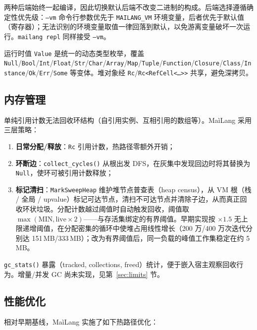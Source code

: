 \documentclass[10pt,a4paper]{article}
\begin{document}
两种后端始终一起编译，因此切换默认后端不改变二进制的构成。后端选择遵循确定性优先级：\texttt{--vm} 命令行参数优先于 \texttt{MAILANG\_VM} 环境变量，后者优先于默认值（寄存器）；无法识别的环境变量取值一律回落到默认，以免游离变量破坏一次运行。\texttt{mailang repl} 同样接受 \texttt{--vm}。

运行时值 \texttt{Value} 是统一的动态类型枚举，覆盖 \texttt{Null}/\texttt{Bool}/\texttt{Int}/\texttt{Float}/\texttt{Str}/\texttt{Char}/\texttt{Array}/\texttt{Map}/\texttt{Tuple}/\texttt{Function}/\texttt{Closure}/\texttt{Class}/\texttt{Instance}/\texttt{Ok}/\texttt{Err}/\texttt{Some} 等变体。堆对象经 \texttt{Rc}/\texttt{Rc<RefCell<\dots>>} 共享，避免深拷贝。

\subsection{内存管理}
\label{sec:gc}

单纯引用计数无法回收环结构（自引用实例、互相引用的数组等）。MaìLang 采用三层策略：

\begin{enumerate}
  \item \textbf{日常分配/释放}：\texttt{Rc} 引用计数，热路径零额外开销；
  \item \textbf{环断边}：\texttt{collect\_cycles()} 从根出发 DFS，在灰集中发现回边时将其替换为 \texttt{Null}，使环可被引用计数释放；
  \item \textbf{标记清扫}：\texttt{MarkSweepHeap} 维护堆节点普查表（heap census），从 VM 根（栈 / 全局 / upvalue）标记可达节点，清扫不可达节点并清除子边，从而真正回收环状垃圾。分配计数越过阈值时自动触发回收，阈值取 $\max(\text{MIN}, \text{live}\times 2)$——与存活集绑定的有界阈值。早期实现按 $\times 1.5$ 无上限递增阈值，在分配密集的循环中使堆占用线性增长（200 万/400 万次迭代分别达 151\,MB/333\,MB）；改为有界阈值后，同一负载的峰值工作集稳定在约 5\,MB。
\end{enumerate}

\texttt{gc\_stats()} 暴露（tracked, collections, freed）统计，便于嵌入宿主观察回收行为。增量/并发 GC 尚未实现，见第~\ref{sec:limits} 节。

\subsection{性能优化}
\label{sec:perf}

相对早期基线，MaìLang 实施了如下热路径优化：
\end{document}
